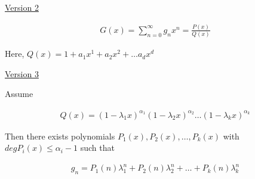 \documentclass{article}
\begin{document}
\underline{Version 2}

\begin{align*}
    G(x) = \sum_{n=0}^{\infty}g_nx^n = \frac{P(x)}{Q(x)}
\end{align*}

Here, $Q(x) = 1 + a_1x^1 + a_2x^2 + \ldots a_dx^d$


\underline{Version 3}

Assume 

\begin{align*}
    Q(x) = (1-\lambda_1x)^{\alpha_1}(1-\lambda_2x)^{\alpha_2}\ldots(1-\lambda_kx)^{\alpha_k}
\end{align*}

Then there exists polynomials $P_1(x), P_2(x), \ldots, P_k(x)$ with $deg P_i(x) \le \alpha_i - 1$ such that 

\begin{align*}
    g_n = P_1(n)\lambda_1^n + P_2(n)\lambda_2^n + \ldots + P_k(n)\lambda_k^n
\end{align*}
\end{document}
